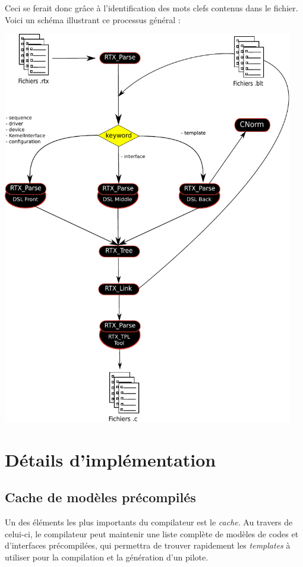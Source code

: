 \documentclass[french]{rtxreport}
\begin{document}
Ceci se ferait donc grâce à l'identification des mots clefs contenus dans le
fichier. Voici un schéma illustrant ce processus général :

\includegraphics[width=0.95\textwidth]{logigramme.pdf}



\chapter{Détails d'implémentation}



\section{Cache de modèles précompilés}

Un des éléments les plus importants du compilateur est le \emph{cache}. Au
travers de celui-ci, le compilateur peut maintenir une liste complète de
modèles de codes et d'interfaces précompilées, qui permettra de trouver
rapidement les \emph{templates} à utiliser pour la compilation et la génération
d'un pilote.
\end{document}
